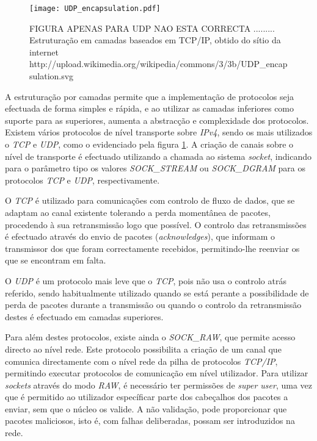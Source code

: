 \begin{figure}[ht]
\centering
\texttt{[image: UDP\_encapsulation.pdf]}
\caption{FIGURA APENAS PARA UDP NAO ESTA CORRECTA ......... Estruturação em camadas baseados em TCP/IP, obtido do sítio da internet http://upload.wikimedia.org/wikipedia/commons/3/3b/UDP\_encapsulation.svg}
\label{fig:stack_tcp_ip}
\end{figure}


A estruturação por camadas permite que a implementação de protocolos seja efectuada de forma simples e rápida, e ao utilizar as camadas inferiores como suporte para as superiores, aumenta a abstracção e complexidade dos protocolos.
Existem vários protocolos de nível transporte sobre \textit{IPv4}, sendo os mais utilizados o \textit{TCP} e \textit{UDP}, como o evidenciado pela figura \ref{fig:stack_tcp_ip}.
A criação de canais sobre o nível de transporte é efectuado utilizando a chamada ao sistema \textit{socket}, indicando para o parâmetro tipo os valores \textit{SOCK\_STREAM} ou \textit{SOCK\_DGRAM} para os protocolos \textit{TCP} e \textit{UDP}, respectivamente.

O \textit{TCP} é utilizado para comunicações com controlo de fluxo de dados, que se adaptam ao canal existente tolerando a perda momentânea de pacotes, procedendo à sua retransmissão logo que possível.
O controlo das retransmissões é efectuado através do envio de pacotes (\textit{acknowledges}), que informam o transmissor dos que foram correctamente recebidos, permitindo-lhe reenviar os que se encontram em falta.

O \textit{UDP} é um protocolo mais leve que o \textit{TCP}, pois não usa o controlo atrás referido, sendo habitualmente utilizado quando se está perante a possibilidade de perda de pacotes durante a transmissão ou quando o controlo da retransmissão destes é efectuado em camadas superiores.

Para além destes protocolos, existe ainda o \textit{SOCK\_RAW}, que permite acesso directo ao nível rede.
Este protocolo possibilita a criação de um canal que comunica directamente com o nível rede da pilha de protocolos \textit{TCP/IP}, permitindo executar protocolos de comunicação em nível utilizador.
Para utilizar \textit{sockets} através do modo \textit{RAW}, é necessário ter permissões de \textit{super user}, uma vez que é permitido ao utilizador específicar parte dos cabeçalhos dos pacotes a enviar, sem que o núcleo os valide.
A não validação, pode proporcionar que pacotes maliciosos, isto é, com falhas deliberadas, possam ser introduzidos na rede.
 
